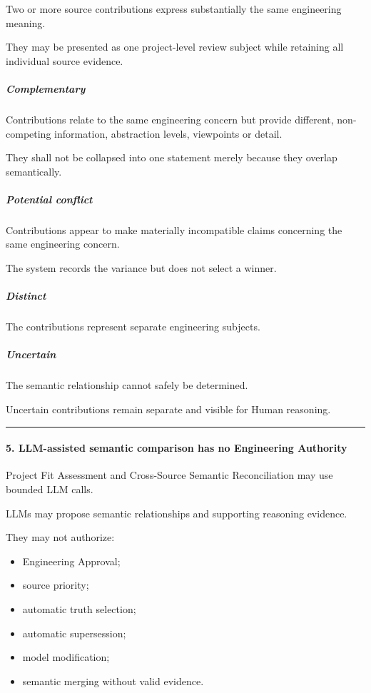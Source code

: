 Two or more source contributions express substantially the same engineering meaning.

They may be presented as one project-level review subject while retaining all individual source evidence.

\hypertarget{complementary}{%
\subparagraph{Complementary}\label{complementary}}

Contributions relate to the same engineering concern but provide different, non-competing information, abstraction levels, viewpoints or detail.

They shall not be collapsed into one statement merely because they overlap semantically.

\hypertarget{potential-conflict}{%
\subparagraph{Potential conflict}\label{potential-conflict}}

Contributions appear to make materially incompatible claims concerning the same engineering concern.

The system records the variance but does not select a winner.

\hypertarget{distinct}{%
\subparagraph{Distinct}\label{distinct}}

The contributions represent separate engineering subjects.

\hypertarget{uncertain}{%
\subparagraph{Uncertain}\label{uncertain}}

The semantic relationship cannot safely be determined.

Uncertain contributions remain separate and visible for Human reasoning.

\begin{center}\rule{0.5\linewidth}{0.5pt}\end{center}

\hypertarget{5-llm-assisted-semantic-comparison-has-no-engineering-authority}{%
\paragraph{5. LLM-assisted semantic comparison has no Engineering Authority}\label{5-llm-assisted-semantic-comparison-has-no-engineering-authority}}

Project Fit Assessment and Cross-Source Semantic Reconciliation may use bounded LLM calls.

LLMs may propose semantic relationships and supporting reasoning evidence.

They may not authorize:

\begin{itemize}
\tightlist
\item
  Engineering Approval;
\item
  source priority;
\item
  automatic truth selection;
\item
  automatic supersession;
\item
  model modification;
\item
  semantic merging without valid evidence.
\end{itemize}


